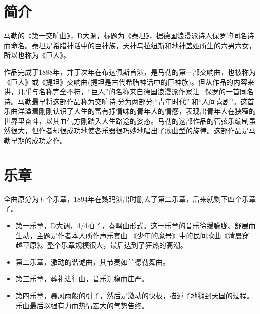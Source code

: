 \documentclass[a4paper,left=2.5cm,right=2.5cm,11pt]{article}
\begin{document}
\tableofcontents

\clearpage

\section{简介}
	马勒的《第一交响曲》，D大调，标题为《泰坦》，据德国浪漫派诗人保罗的同名诗而命名。泰坦是希腊神话中的巨神族，天神乌拉纽斯和地神盖娅所生的六男六女，所以也称为《巨人》。\par
	作品完成于1888年，并于次年在布达佩斯首演，是马勒的第一部交响曲，也被称为《巨人》或《提坦》交响曲(提坦是古代希腊神话中的巨神族)。但从作品的内容来讲，几乎与名称完全不符，“巨人”的名称来自德国浪漫派作家让·保罗的一首同名诗。马勒最早将这部作品称为交响诗,分为两部分,“青年时代” 和“人间喜剧”。这首乐曲洋溢着刚刚认识了人生的富有抒情味的青年人的情感，表现出青年人在狭窄的世界里奋斗，以其血气方刚踏入人生路途的姿态。马勒的这部作品的管弦乐编制虽然很大，但作者却很成功地使各乐器很巧妙地唱出了歌曲型的旋律。这部作品是马勒早期的成功之作。\par

\section{乐章}
	全曲原分为五个乐章，1894年在魏玛演出时删去了第二乐章，后来就剩下四个乐章了。
	\begin{itemize}
		\item 第一乐章，D大调，4/4拍子，奏鸣曲形式。这一乐章的音乐徐缓朦胧、舒展而生动，主题是作者本人所作声乐套曲 《少年的魔号》中的民间歌曲《清晨穿越草原》。整个乐章规模很大，最后达到了狂热的高潮。
		\item 第二乐章，激动的谐谑曲，其节奏如兰德勒舞曲。
		\item 第三乐章，葬礼进行曲，音乐沉稳而庄严。
		\item 第四乐章，暴风雨般的引子，然后是激动的快板，描述了地狱到天国的过程。乐曲最后以强有力而热情宏大的气势告终。
	\end{itemize}
\end{document}
